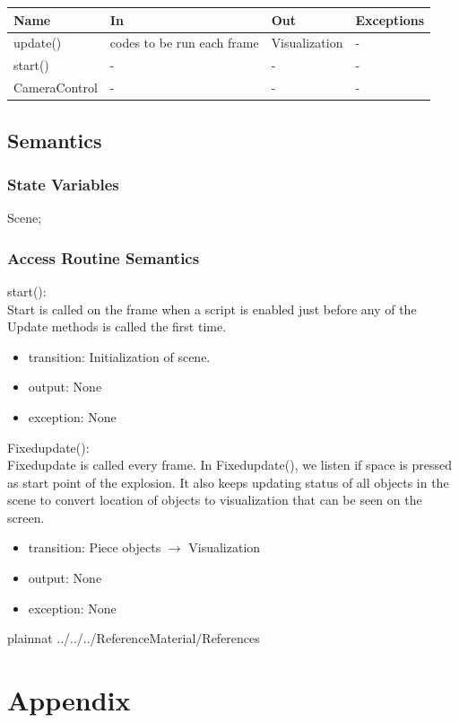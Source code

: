 \documentclass[12pt, titlepage]{article}
\begin{document}
\begin{center}
	\begin{tabular}{p{3cm} p{4cm} p{4cm} p{2cm}}
		\hline
		\textbf{Name} & \textbf{In} & \textbf{Out} & \textbf{Exceptions} \\
		\hline
		update() & codes to be run each frame & Visualization & - \\
		start() & - & - & - \\
		CameraControl & - & - & - \\
		\hline
	\end{tabular}
\end{center}

\subsection{Semantics}

\subsubsection{State Variables}

Scene;\\
\subsubsection{Access Routine Semantics}

\noindent start():\\
Start is called on the frame when a script is enabled just before any of the Update methods is called the first time.
\begin{itemize}
	\item transition: Initialization of scene.
	\item output: None 
	\item exception: None  
\end{itemize}

\noindent Fixedupdate():\\
Fixedupdate is called every frame. In Fixedupdate(), we listen if space is pressed as start point of the explosion. It also keeps updating status of all objects in the scene to convert location of objects to visualization that can be seen on the screen.
\begin{itemize}
	\item transition: Piece objects $\rightarrow$ Visualization 
	\item output: None 
	\item exception: None  
\end{itemize}

\newpage

 {plainnat}
 {../../../ReferenceMaterial/References}

\newpage

\section{Appendix} \label{Appendix}
\end{document}
